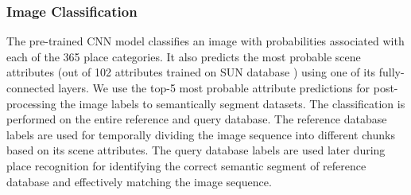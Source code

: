 \documentclass[letterpaper, 10 pt, conference]{ieeeconf}  %
\begin{document}
\subsubsection{Image Classification}


The pre-trained CNN model classifies an image with probabilities associated with each of the 365 place categories. It also predicts the most probable scene attributes (out of 102 attributes trained on SUN database \cite{Patterson2012SunAttributes}) using one of its fully-connected layers. We use the top-5 most probable attribute predictions for post-processing the image labels to semantically segment datasets. The classification is performed on the entire reference and query database. The reference database labels are used for temporally dividing the image sequence into different chunks based on its scene attributes. The query database labels are used later during place recognition for identifying the correct semantic segment of reference database and effectively matching the image sequence.
\end{document}
